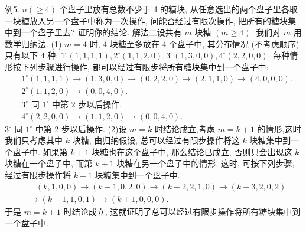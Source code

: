例5. $n(\geqslant 4)$ 个盘子里放有总数不少于 4 的糖块, 从任意选出的两个盘子里各取一块糖放人另一个盘子中称为一次操作, 问能否经过有限次操作, 把所有的糖块集中到一个盘子里去? 证明你的结论.
解法二设共有 $m$ 块糖 $(m \geqslant 4)$. 我们对 $m$ 用数学归纳法.
(1) $m=4$ 时, 4 块糖至多放在 4 个盘子中, 其分布情况 (不考虑顺序) 只有以下 4 种: $1^{\circ}(1,1,1,1), 2^{\circ}(1,1,2,0), 3^{\circ}(1,3,0,0), 4^{\circ}(2,2,0,0)$. 每种情形按下列步骤进行操作, 都可以经过有限步将所有糖块集中到一个盘子中:
$$
\begin{aligned}
& 1^{\circ}(1,1,1,1) \rightarrow(1,3,0,0) \rightarrow(0,2,2,0) \rightarrow(2,1,1,0) \rightarrow(4,0,0,0) . \\
& 2^{\circ}(1,1,2,0) \rightarrow(0,0,4,0) . \\
& 3^{\circ} \text { 同 } 1^{\circ} \text { 中第 } 2 \text { 步以后操作.
} \\
& 4^{\circ}(2,2,0,0) \rightarrow(1,1,2,0) \rightarrow(0,0,4,0) .
\end{aligned}
$$
$3^{\circ}$ 同 $1^{\circ}$ 中第 2 步以后操作.
(2)设 $m=k$ 时结论成立,考虑 $m=k+1$ 的情形,这时我们只考虑其中 $k$ 块糖, 由归纳假设, 总可以经过有限步操作将这 $k$ 块糖集中到一个盘子中.
如果第 $k+1$ 块糖也在这个盘子中, 那么结论已成立, 否则只会出现这 $k$ 块糖在一个盘子中, 而第 $k+1$ 块糖在另一个盘子中的情形, 这时, 可按下列步骤, 经过有限步操作将 $k+1$ 块糖集中到一个盘子中.
$$
\begin{aligned}
& \quad(k, 1,0,0) \rightarrow(k-1,0,2,0) \rightarrow(k-2,2,1,0) \rightarrow(k-3,2,0,2) \\
& \rightarrow(k-1,1,0,1) \rightarrow(k+1,0,0,0) .
\end{aligned}
$$
于是 $m=k+1$ 时结论成立, 这就证明了总可以经过有限步操作将所有糖块集中到一个盘子中.


